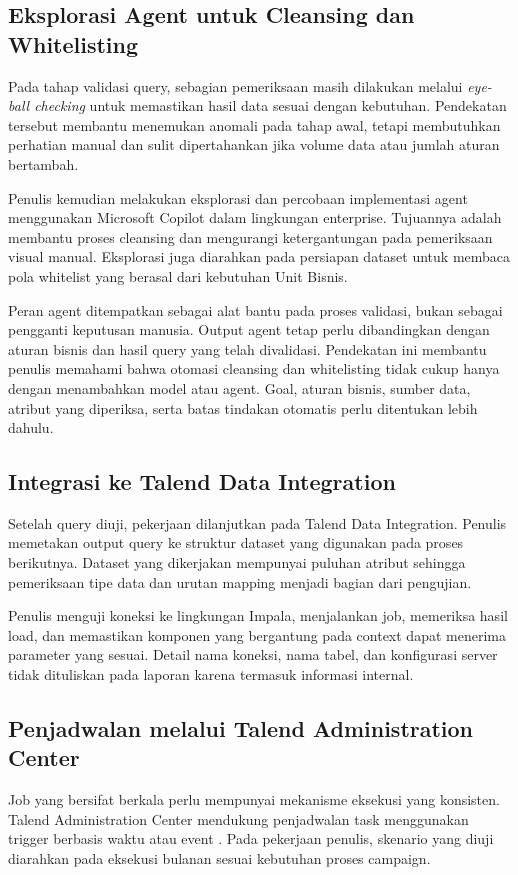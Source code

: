 \subsection{Eksplorasi Agent untuk Cleansing dan Whitelisting}
Pada tahap validasi query, sebagian pemeriksaan masih dilakukan melalui \textit{eye-ball checking} untuk memastikan hasil data sesuai dengan kebutuhan. Pendekatan tersebut membantu menemukan anomali pada tahap awal, tetapi membutuhkan perhatian manual dan sulit dipertahankan jika volume data atau jumlah aturan bertambah.

Penulis kemudian melakukan eksplorasi dan percobaan implementasi agent menggunakan Microsoft Copilot dalam lingkungan enterprise. Tujuannya adalah membantu proses cleansing dan mengurangi ketergantungan pada pemeriksaan visual manual. Eksplorasi juga diarahkan pada persiapan dataset untuk membaca pola whitelist yang berasal dari kebutuhan Unit Bisnis.

Peran agent ditempatkan sebagai alat bantu pada proses validasi, bukan sebagai pengganti keputusan manusia. Output agent tetap perlu dibandingkan dengan aturan bisnis dan hasil query yang telah divalidasi. Pendekatan ini membantu penulis memahami bahwa otomasi cleansing dan whitelisting tidak cukup hanya dengan menambahkan model atau agent. Goal, aturan bisnis, sumber data, atribut yang diperiksa, serta batas tindakan otomatis perlu ditentukan lebih dahulu.

\subsection{Integrasi ke Talend Data Integration}
Setelah query diuji, pekerjaan dilanjutkan pada Talend Data Integration. Penulis memetakan output query ke struktur dataset yang digunakan pada proses berikutnya. Dataset yang dikerjakan mempunyai puluhan atribut sehingga pemeriksaan tipe data dan urutan mapping menjadi bagian dari pengujian.

Penulis menguji koneksi ke lingkungan Impala, menjalankan job, memeriksa hasil load, dan memastikan komponen yang bergantung pada context dapat menerima parameter yang sesuai. Detail nama koneksi, nama tabel, dan konfigurasi server tidak dituliskan pada laporan karena termasuk informasi internal.

\subsection{Penjadwalan melalui Talend Administration Center}
Job yang bersifat berkala perlu mempunyai mekanisme eksekusi yang konsisten. Talend Administration Center mendukung penjadwalan task menggunakan trigger berbasis waktu atau event \autocite{talend2026}. Pada pekerjaan penulis, skenario yang diuji diarahkan pada eksekusi bulanan sesuai kebutuhan proses campaign.

